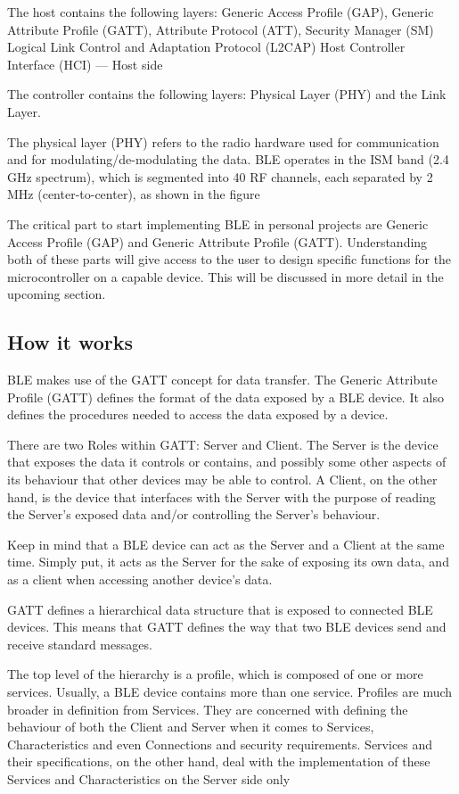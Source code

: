 The host contains the following layers: Generic Access Profile (GAP), Generic Attribute Profile (GATT), Attribute Protocol (ATT), Security Manager (SM) Logical Link Control and Adaptation Protocol (L2CAP) Host Controller Interface (HCI) — Host side

The controller contains the following layers: Physical Layer (PHY) and the Link Layer.

The physical layer (PHY) refers to the radio hardware used for communication and for modulating/de-modulating the data. BLE operates in the ISM band (2.4 GHz spectrum), which is segmented into 40 RF channels, each separated by 2 MHz (center-to-center), as shown in the figure

The critical part to start implementing BLE in personal projects are Generic Access Profile (GAP) and Generic Attribute Profile (GATT). Understanding both of these parts will give access to the user to design specific functions for the microcontroller on a capable device. This will be discussed in more detail in the upcoming section.

\subsection{How it works}

BLE makes use of the GATT concept for data transfer.
The Generic Attribute Profile (GATT) defines the format of the data exposed by a BLE device. It also defines the procedures needed to access the data exposed by a device.

There are two Roles within GATT: Server and Client. The Server is the device that exposes the data it controls or contains, and possibly some other aspects of its behaviour that other devices may be able to control. A Client, on the other hand, is the device that interfaces with the Server with the purpose of reading the Server’s exposed data and/or controlling the Server’s behaviour.

Keep in mind that a BLE device can act as the Server and a Client at the same time. Simply put, it acts as the Server for the sake of exposing its own data, and as a client when accessing another device’s data.

GATT defines a hierarchical data structure that is exposed to connected BLE devices. This means that GATT defines the way that two BLE devices send and receive standard messages.

The top level of the hierarchy is a profile, which is composed of one or more services. Usually, a BLE device contains more than one service. Profiles are much broader in definition from Services. They are concerned with defining the behaviour of both the Client and Server when it comes to Services, Characteristics and even Connections and security requirements. Services and their specifications, on the other hand, deal with the implementation of these Services and Characteristics on the Server side only

